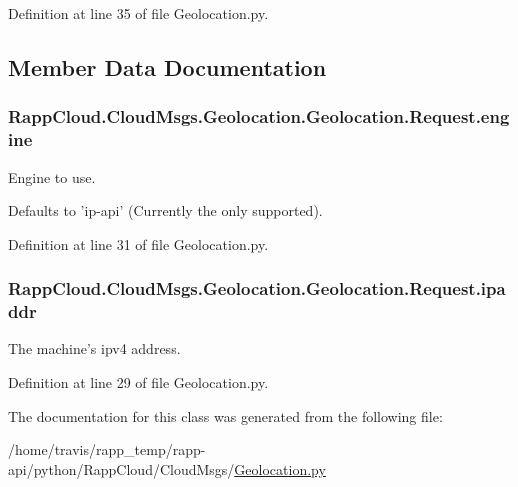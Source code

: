 Definition at line 35 of file Geolocation.\-py.



\subsection{Member Data Documentation}
\hypertarget{classRappCloud_1_1CloudMsgs_1_1Geolocation_1_1Geolocation_1_1Request_a2c418195f54a0e64f987b2404b592644}{
\subsubsection[{engine}]{\setlength{\rightskip}{0pt plus 5cm}Rapp\-Cloud.\-Cloud\-Msgs.\-Geolocation.\-Geolocation.\-Request.\-engine}}\label{classRappCloud_1_1CloudMsgs_1_1Geolocation_1_1Geolocation_1_1Request_a2c418195f54a0e64f987b2404b592644}


Engine to use. 

Defaults to 'ip-\/api' (Currently the only supported). 

Definition at line 31 of file Geolocation.\-py.

\hypertarget{classRappCloud_1_1CloudMsgs_1_1Geolocation_1_1Geolocation_1_1Request_a1da80c2b468e59f96d6cfa8bb06e95d3}{
\subsubsection[{ipaddr}]{\setlength{\rightskip}{0pt plus 5cm}Rapp\-Cloud.\-Cloud\-Msgs.\-Geolocation.\-Geolocation.\-Request.\-ipaddr}}\label{classRappCloud_1_1CloudMsgs_1_1Geolocation_1_1Geolocation_1_1Request_a1da80c2b468e59f96d6cfa8bb06e95d3}


The machine's ipv4 address. 



Definition at line 29 of file Geolocation.\-py.



The documentation for this class was generated from the following file\-:\begin{DoxyCompactItemize}
\item 
/home/travis/rapp\-\_\-temp/rapp-\/api/python/\-Rapp\-Cloud/\-Cloud\-Msgs/\hyperlink{Geolocation_8py}{Geolocation.\-py}\end{DoxyCompactItemize}
